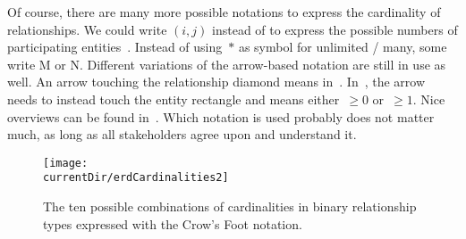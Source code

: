 Of course, there are many more possible notations to express the cardinality of relationships.
We could write $(i,j)$ instead of  to express the possible numbers of participating entities~\cite{SS2005EIDDDFDB:CDDICAMP,G2011EW2ITDS:CMUTERM}.
Instead of using~$*$ as symbol for unlimited / many, some write M or N.
Different variations of the arrow-based notation are still in use as well.
An arrow touching the relationship diamond means  in~\cite{V1999C5DMS:CDUTERM}.
In~\cite{G2011EW2ITDS:CMUTERM}, the arrow needs to instead touch the entity rectangle and means either~$\geq0$ or~$\geq1$.
Nice overviews can be found in~\cite{B2025DS:AGTTERDE,S2012IITDM:AAAPGTERM}.
Which notation is used probably does not matter much, as long as all stakeholders agree upon and understand it.%
%
\begin{figure}%
\centering%
\texttt{[image: \\currentDir/erdCardinalities2]}%
\caption{The ten possible combinations of cardinalities in binary relationship types expressed with the Crow's Foot notation.}%
\label{fig:erdCardinalities2}%
\end{figure}%

